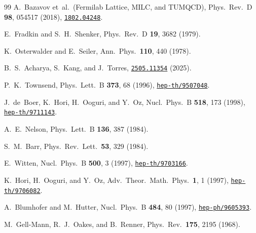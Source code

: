 \documentclass[12pt,a4paper]{article}
\begin{document}
\begin{thebibliography}{99}
  A.~Bazavov et~al.\ (Fermilab Lattice, MILC, and TUMQCD),
  Phys.\ Rev.\ D \textbf{98}, 054517 (2018),
  \href{https://arxiv.org/abs/1802.04248}{\texttt{1802.04248}}.

  E.~Fradkin and S.~H.~Shenker,
  Phys.\ Rev.\ D \textbf{19}, 3682 (1979).

  K.~Osterwalder and E.~Seiler,
  Ann.\ Phys.\ \textbf{110}, 440 (1978).

  B.~S.~Acharya, S.~Kang, and J.~Torres,
  \href{https://arxiv.org/abs/2505.11354}{\texttt{2505.11354}} (2025).

  P.~K.~Townsend,
  Phys.\ Lett.\ B \textbf{373}, 68 (1996),
  \href{https://arxiv.org/abs/hep-th/9507048}{\texttt{hep-th/9507048}}.

  J.~de~Boer, K.~Hori, H.~Ooguri, and Y.~Oz,
  Nucl.\ Phys.\ B \textbf{518}, 173 (1998),
  \href{https://arxiv.org/abs/hep-th/9711143}{\texttt{hep-th/9711143}}.

  A.~E.~Nelson,
  Phys.\ Lett.\ B \textbf{136}, 387 (1984).

  S.~M.~Barr,
  Phys.\ Rev.\ Lett.\ \textbf{53}, 329 (1984).

  E.~Witten,
  Nucl.\ Phys.\ B \textbf{500}, 3 (1997),
  \href{https://arxiv.org/abs/hep-th/9703166}{\texttt{hep-th/9703166}}.

  K.~Hori, H.~Ooguri, and Y.~Oz,
  Adv.\ Theor.\ Math.\ Phys.\ \textbf{1}, 1 (1997),
  \href{https://arxiv.org/abs/hep-th/9706082}{\texttt{hep-th/9706082}}.

  A.~Blumhofer and M.~Hutter,
  Nucl.\ Phys.\ B \textbf{484}, 80 (1997),
  \href{https://arxiv.org/abs/hep-ph/9605393}{\texttt{hep-ph/9605393}}.

  M.~Gell-Mann, R.~J.~Oakes, and B.~Renner,
  Phys.\ Rev.\ \textbf{175}, 2195 (1968).

\end{thebibliography}
\end{document}
